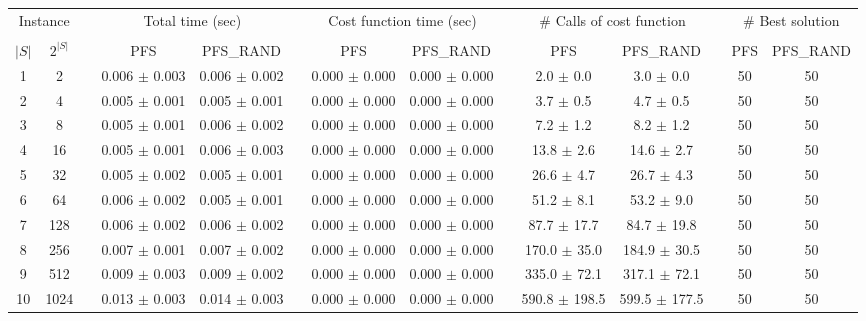 \documentclass[11pt]{article}
\begin{document}
\begin{landscape}
\begin{table}
\centering
\footnotesize
\begin{tabular}{cccccccccccccc}
\toprule
\multicolumn{2}{c}{Instance} & \phantom{} & \multicolumn{2}{c}{Total time (sec)}  & \phantom{} & \multicolumn{2}{c}{Cost function time (sec)}  & \phantom{} & \multicolumn{2}{c}{\# Calls of cost function}  & \phantom{} & \multicolumn{2}{c}{\# Best solution}\\
\cline{1-2}\cline{4-5}\cline{7-8}\cline{10-11}\cline{13-14}\\
$|S|$ & $2^{|S|}$ && PFS & PFS_RAND && PFS & PFS_RAND && PFS & PFS_RAND && PFS & PFS_RAND \\
 1 &       2 &&  0.006 $\pm$ 0.003 & 0.006 $\pm$ 0.002 &&  0.000 $\pm$ 0.000 & 0.000 $\pm$ 0.000 &&   2.0 $\pm$  0.0 &  3.0 $\pm$  0.0 && 50& 50\\
 2 &       4 &&  0.005 $\pm$ 0.001 & 0.005 $\pm$ 0.001 &&  0.000 $\pm$ 0.000 & 0.000 $\pm$ 0.000 &&   3.7 $\pm$  0.5 &  4.7 $\pm$  0.5 && 50& 50\\
 3 &       8 &&  0.005 $\pm$ 0.001 & 0.006 $\pm$ 0.002 &&  0.000 $\pm$ 0.000 & 0.000 $\pm$ 0.000 &&   7.2 $\pm$  1.2 &  8.2 $\pm$  1.2 && 50& 50\\
 4 &      16 &&  0.005 $\pm$ 0.001 & 0.006 $\pm$ 0.003 &&  0.000 $\pm$ 0.000 & 0.000 $\pm$ 0.000 &&  13.8 $\pm$  2.6 & 14.6 $\pm$  2.7 && 50& 50\\
 5 &      32 &&  0.005 $\pm$ 0.002 & 0.005 $\pm$ 0.001 &&  0.000 $\pm$ 0.000 & 0.000 $\pm$ 0.000 &&  26.6 $\pm$  4.7 & 26.7 $\pm$  4.3 && 50& 50\\
 6 &      64 &&  0.006 $\pm$ 0.002 & 0.005 $\pm$ 0.001 &&  0.000 $\pm$ 0.000 & 0.000 $\pm$ 0.000 &&  51.2 $\pm$  8.1 & 53.2 $\pm$  9.0 && 50& 50\\
 7 &     128 &&  0.006 $\pm$ 0.002 & 0.006 $\pm$ 0.002 &&  0.000 $\pm$ 0.000 & 0.000 $\pm$ 0.000 &&  87.7 $\pm$ 17.7 & 84.7 $\pm$ 19.8 && 50& 50\\
 8 &     256 &&  0.007 $\pm$ 0.001 & 0.007 $\pm$ 0.002 &&  0.000 $\pm$ 0.000 & 0.000 $\pm$ 0.000 &&  170.0 $\pm$ 35.0 & 184.9 $\pm$ 30.5 && 50& 50\\
 9 &     512 &&  0.009 $\pm$ 0.003 & 0.009 $\pm$ 0.002 &&  0.000 $\pm$ 0.000 & 0.000 $\pm$ 0.000 &&  335.0 $\pm$ 72.1 & 317.1 $\pm$ 72.1 && 50& 50\\
10 &    1024 &&  0.013 $\pm$ 0.003 & 0.014 $\pm$ 0.003 &&  0.000 $\pm$ 0.000 & 0.000 $\pm$ 0.000 &&  590.8 $\pm$ 198.5 & 599.5 $\pm$ 177.5 && 50& 50\\

\end{tabular}
\end{table}
\end{landscape}
\end{document}
